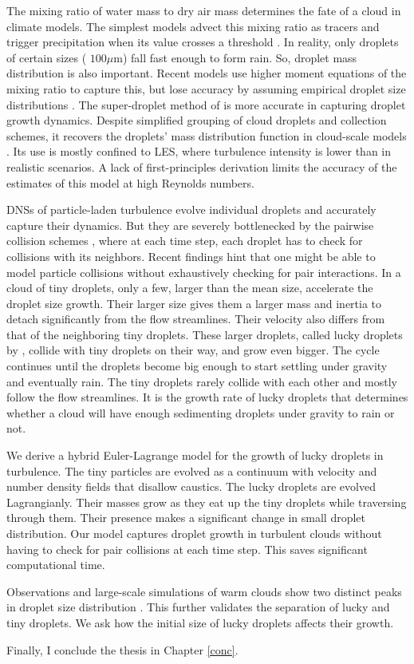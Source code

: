 \documentclass[../Rajarshi-thesis-draft.tex]{subfiles}
\begin{document}
The mixing ratio of water mass to dry air mass determines the fate of a cloud in climate models. The simplest models advect this mixing ratio as tracers and trigger precipitation when its value crosses a threshold \cite{brown2023}. In reality, only droplets of certain sizes ( $100\mu$m) fall fast enough to form rain. So, droplet mass distribution is also important. Recent models use higher moment equations of the mixing ratio to capture this, but lose accuracy by assuming empirical droplet size distributions \cite{liu2023}. The super-droplet method of \citet{shima2009} is more accurate in capturing droplet growth dynamics. Despite simplified grouping of cloud droplets and collection schemes, it recovers the droplets' mass distribution function in cloud-scale models \cite{matsushima2023}. Its use is mostly confined to LES, where turbulence intensity is lower than in realistic scenarios. A lack of first-principles derivation limits the accuracy of the estimates of this model at high Reynolds numbers.

DNSs of particle-laden turbulence evolve individual droplets and accurately capture their dynamics. But they are severely bottlenecked by the pairwise collision schemes \cite{sundaram1996}, where at each time step, each droplet has to check for collisions with its neighbors. Recent findings hint that one might be able to model particle collisions without exhaustively checking for pair interactions. In a cloud of tiny droplets, only a few, larger than the mean size, accelerate the droplet size growth. Their larger size gives them a larger mass and inertia to detach significantly from the flow streamlines. Their velocity also differs from that of the neighboring tiny droplets. These larger droplets, called lucky droplets by \citet{wilkinson2016}, collide with tiny droplets on their way, and grow even bigger. The cycle continues until the droplets become big enough to start settling under gravity and eventually rain. The tiny droplets rarely collide with each other and mostly follow the flow streamlines. It is the growth rate of lucky droplets that determines whether a cloud will have enough sedimenting droplets under gravity to rain or not. 

We derive a hybrid Euler-Lagrange model for the growth of lucky droplets in turbulence. The tiny particles are evolved as a continuum with velocity and number density fields that disallow caustics. The lucky droplets are evolved Lagrangianly. Their masses grow as they eat up the tiny droplets while traversing through them. Their presence makes a significant change in small droplet distribution. Our model captures droplet growth in turbulent clouds without having to check for pair collisions at each time step. This saves significant computational time.

Observations and large-scale simulations of warm clouds show two distinct peaks in droplet size distribution \cite{chandrakar2024}. This further validates the separation of lucky and tiny droplets. We ask how the initial size of lucky droplets affects their growth.


Finally, I conclude the thesis in Chapter \ref{conc}.
\end{document}
